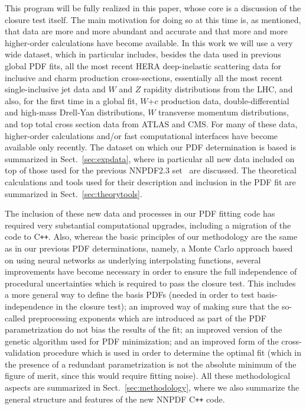 This program will be fully realized in this paper, whose core is a
discussion of the closure test itself. The main motivation for doing
so at this time is, as mentioned, that data are more and more abundant
and accurate and that more and more higher-order calculations have
become available. 
%
In this work
 we will use a very wide dataset, which in
particular includes, besides the data used in previous global PDF fits, 
all the most recent HERA deep-inelastic scattering
data for inclusive and charm production
cross-sections, 
essentially all the most recent single-inclusive jet data and $W$
and $Z$ rapidity distributions from
the LHC, and also, for the first time in a
global fit, $W$+$c$ production data, double-differential and high-mass Drell-Yan
distributions, $W$ transverse momentum distributions, and top total
cross section data from ATLAS and CMS. 
%
For many of these data, higher-order calculations
and/or fast computational interfaces
have become available only recently.  The dataset on which
our PDF determination is based is summarized in Sect.~\ref{sec:expdata}, where
in particular all new data included on top
of those used for the previous NNPDF2.3 set~\cite{Ball:2012cx} are
discussed. The theoretical calculations and tools used for their
description and inclusion  in the PDF fit are summarized in
Sect.~\ref{sec:theorytools}.

The  inclusion of these new data and processes in our
PDF fitting code has required very substantial computational upgrades,
including a migration of the code to C{}\verb!++!.
%
Also, whereas the basic principles of our methodology are the same as in our
previous PDF determinations, namely, a Monte Carlo approach based on
using neural networks as underlying interpolating functions, several
improvements have become necessary in order to ensure the full
independence of procedural uncertainties which is required to pass the
closure test. This includes a more general way to define the basis
PDFs (needed in order to test basis-independence in the
closure test); an improved way of making sure that the
so-called preprocessing exponents which are introduced as part of the
PDF parametrization do not bias the results of the fit; an improved
version of the genetic algorithm used for PDF minimization; and an
improved form of the cross-validation procedure which is used in order
to determine the optimal fit (which in the presence of a redundant
parametrization is not the absolute minimum of the figure of merit,
since this would require fitting noise). All these methodological
aspects are summarized in Sect.~\ref{sec:methodology}, where we also summarize
the general structure and features of the new NNPDF 
 C{}\verb!++! code.

